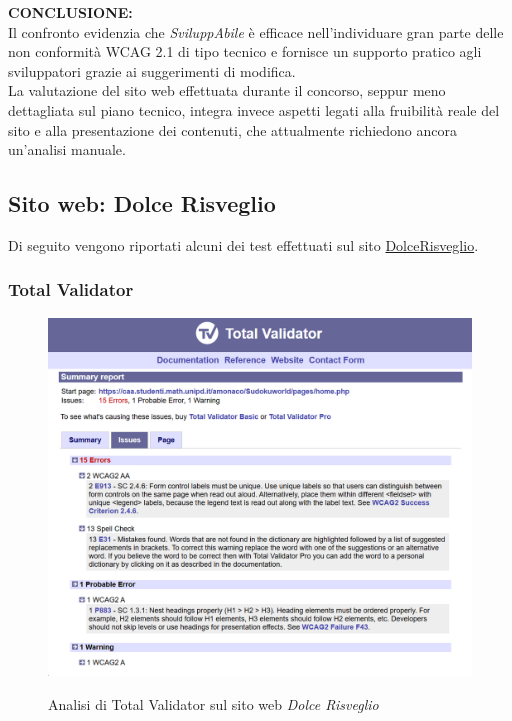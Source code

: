 \vspace{0.5cm}
\noindent \textbf{CONCLUSIONE:}\\
\noindent Il confronto evidenzia che \textit{SviluppAbile} è efficace nell’individuare gran parte delle non conformità WCAG 2.1 di tipo tecnico e fornisce un supporto pratico agli sviluppatori grazie ai suggerimenti di modifica.\\
La valutazione del sito web effettuata durante il concorso, seppur meno dettagliata sul piano tecnico, integra invece aspetti legati alla fruibilità reale del sito e alla presentazione dei contenuti, che attualmente richiedono ancora un’analisi manuale.

\subsection{Sito web: Dolce Risveglio}
\noindent Di seguito vengono riportati alcuni dei test effettuati sul sito \href{https://caa.studenti.math.unipd.it/gchecchi/}{DolceRisveglio}.

\subsubsection{Total Validator}
\begin{figure}[H]
    \centering
    \includegraphics[width=0.7\linewidth, alt={Screenshot dell'analisi di Total Validator sul sito web Dolce Risveglio}]{img/TV_sudoku.png}
    \caption{Analisi di Total Validator sul sito web \textit{Dolce Risveglio}}\label{fig:TV_sudoku}
\end{figure}

